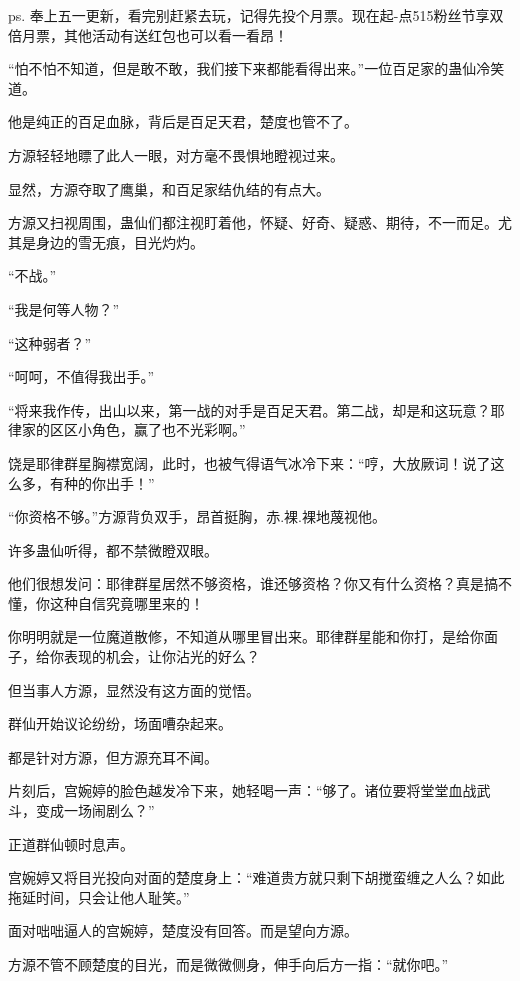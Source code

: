 
\begin{this_body}

ps. 奉上五一更新，看完别赶紧去玩，记得先投个月票。现在起-点515粉丝节享双倍月票，其他活动有送红包也可以看一看昂！

“怕不怕不知道，但是敢不敢，我们接下来都能看得出来。”一位百足家的蛊仙冷笑道。

他是纯正的百足血脉，背后是百足天君，楚度也管不了。

方源轻轻地瞟了此人一眼，对方毫不畏惧地瞪视过来。

显然，方源夺取了鹰巢，和百足家结仇结的有点大。

方源又扫视周围，蛊仙们都注视盯着他，怀疑、好奇、疑惑、期待，不一而足。尤其是身边的雪无痕，目光灼灼。

“不战。”

“我是何等人物？”

“这种弱者？”

“呵呵，不值得我出手。”

“将来我作传，出山以来，第一战的对手是百足天君。第二战，却是和这玩意？耶律家的区区小角色，赢了也不光彩啊。”

饶是耶律群星胸襟宽阔，此时，也被气得语气冰冷下来：“哼，大放厥词！说了这么多，有种的你出手！”

“你资格不够。”方源背负双手，昂首挺胸，赤.裸.裸地蔑视他。

许多蛊仙听得，都不禁微瞪双眼。

他们很想发问：耶律群星居然不够资格，谁还够资格？你又有什么资格？真是搞不懂，你这种自信究竟哪里来的！

你明明就是一位魔道散修，不知道从哪里冒出来。耶律群星能和你打，是给你面子，给你表现的机会，让你沾光的好么？

但当事人方源，显然没有这方面的觉悟。

群仙开始议论纷纷，场面嘈杂起来。

都是针对方源，但方源充耳不闻。

片刻后，宫婉婷的脸色越发冷下来，她轻喝一声：“够了。诸位要将堂堂血战武斗，变成一场闹剧么？”

正道群仙顿时息声。

宫婉婷又将目光投向对面的楚度身上：“难道贵方就只剩下胡搅蛮缠之人么？如此拖延时间，只会让他人耻笑。”

面对咄咄逼人的宫婉婷，楚度没有回答。而是望向方源。

方源不管不顾楚度的目光，而是微微侧身，伸手向后方一指：“就你吧。”


\end{this_body}

